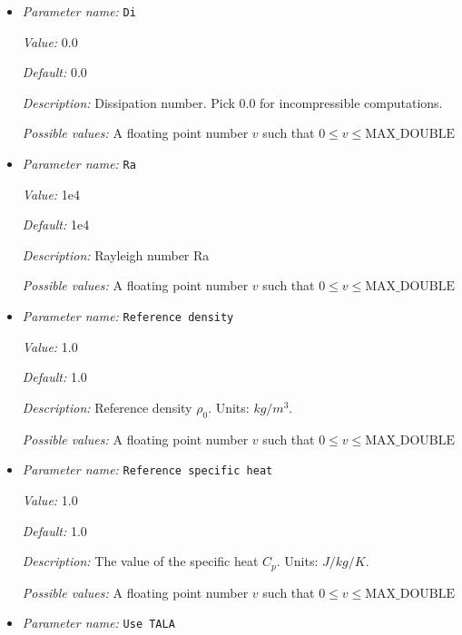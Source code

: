 \begin{itemize}
\item {\it Parameter name:} {\tt Di}
\label{parameters:Material model/Nondimensional model/Di}


{\it Value:} 0.0


{\it Default:} 0.0


{\it Description:} Dissipation number. Pick 0.0 for incompressible computations.


{\it Possible values:} A floating point number $v$ such that $0 \leq v \leq \text{MAX\_DOUBLE}$
\item {\it Parameter name:} {\tt Ra}
\label{parameters:Material model/Nondimensional model/Ra}


{\it Value:} 1e4


{\it Default:} 1e4


{\it Description:} Rayleigh number Ra


{\it Possible values:} A floating point number $v$ such that $0 \leq v \leq \text{MAX\_DOUBLE}$
\item {\it Parameter name:} {\tt Reference density}
\label{parameters:Material model/Nondimensional model/Reference density}


{\it Value:} 1.0


{\it Default:} 1.0


{\it Description:} Reference density $\rho_0$. Units: $kg/m^3$.


{\it Possible values:} A floating point number $v$ such that $0 \leq v \leq \text{MAX\_DOUBLE}$
\item {\it Parameter name:} {\tt Reference specific heat}
\label{parameters:Material model/Nondimensional model/Reference specific heat}


{\it Value:} 1.0


{\it Default:} 1.0


{\it Description:} The value of the specific heat $C_p$. Units: $J/kg/K$.


{\it Possible values:} A floating point number $v$ such that $0 \leq v \leq \text{MAX\_DOUBLE}$
\item {\it Parameter name:} {\tt Use TALA}
\label{parameters:Material model/Nondimensional model/Use TALA}



\end{itemize}
